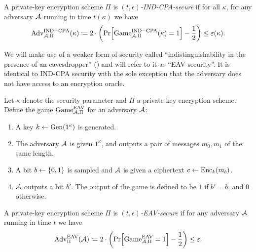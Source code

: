 \begin{definition}
	A private-key encryption scheme $\Pi$ is \emph{$(t, \epsilon)$-IND-CPA-secure} if for all $\kappa$, for any adversary $\mathcal{A}$ running in time $t(\kappa)$ we have
	\begin{align*}
		\mathrm{Adv}_{\adv, \Pi}^{\mathrm{IND-CPA}}(\kappa) \coloneqq 2 \cdot \left(\pr{\mathrm{Game}_{\adv, \Pi}^{\mathrm{IND-CPA}}(\kappa) = 1} - \frac{1}{2}\right) \le \epsilon(\kappa).
	\end{align*}
\end{definition}

We will make use of a weaker form of security called ``indistinguishability in the presence of an eavesdropper'' (\cite{introduction-to-modern-cryptography}) and will refer to it as ``EAV security''. It is identical to IND-CPA security with the sole exception that the adversary does not have access to an encryption oracle.

\begin{definition}
	Let $\kappa$ denote the security parameter and $\Pi$ a private-key encryption scheme. Define the game $\mathrm{Game}_{\mathcal{A}, \Pi}^{\mathrm{EAV}}$ for an adversary $\mathcal{A}$:
	\begin{enumerate}[1.]
		\item A key $k \leftarrow \mathrm{Gen}(1^\kappa)$ is generated.
		\item The adversary $\mathcal{A}$ is given $1^\kappa$, and outputs a pair of messages $m_0, m_1$ of the same length.
		\item A bit $b \leftarrow \{0, 1\}$ is sampled and $\mathcal{A}$ is given a ciphertext $c \leftarrow \mathrm{Enc}_k(m_b)$.
		\item $\mathcal{A}$ outputs a bit $b'$. The output of the game is defined to be $1$ if $b' = b$, and $0$ otherwise.
	\end{enumerate}
\end{definition}

\begin{definition}
	A private-key encryption scheme $\Pi$ is \emph{$(t, \epsilon)$-EAV-secure} if for any adversary $\mathcal{A}$ running in time $t$ we have
	\begin{align*}
		\mathrm{Adv}_{\Pi}^{\mathrm{EAV}}(\adv) \coloneqq 2 \cdot \left(\pr{\mathrm{Game}_{\adv, \Pi}^{\mathrm{EAV}} = 1} - \frac{1}{2}\right) \le \epsilon.
	\end{align*}
\end{definition}


